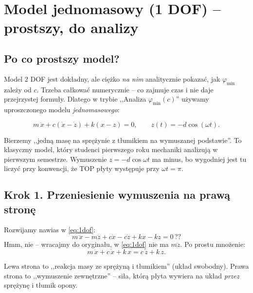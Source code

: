 \documentclass[11pt,a4paper]{article}
\theoremstyle{plainpol}
\begin{document}
\section{Model jednomasowy (1 DOF) -- prostszy, do analizy}\label{sec:1dof}

\subsection{Po co prostszy model?}

Model 2 DOF jest dokładny, ale ciężko \emph{na nim} analitycznie pokazać,
jak $\varphi_{\min}$ zależy od $c$. Trzeba całkować numerycznie -- co
zajmuje czas i nie daje przejrzystej formuły. Dlatego w trybie ,,Analiza
$\varphi_{\min}(c)$'' używamy uproszczonego modelu \emph{jednomasowego}:

\begin{equation}
  m\,\ddot{x} + c(\dot{x} - \dot{z}) + k(x - z) = 0,\qquad z(t) = -d\cos(\omega t).
  \label{eq:1dof}
\end{equation}

\begin{intuicja}
Bierzemy ,,jedną masę na sprężynie z tłumikiem na wymuszanej
podstawie''. To klasyczny model, który studenci pierwszego roku
mechaniki analizują w pierwszym semestrze. Wymuszenie $z = -d\cos\omega t$
ma minus, bo wygodniej jest tu liczyć przy konwencji, że TOP płyty
występuje przy $\omega t = \pi$.
\end{intuicja}

\subsection{Krok 1. Przeniesienie wymuszenia na prawą stronę}

Rozwijamy nawias w \cref{eq:1dof}:
\begin{equation}
  m\,\ddot{x} - m\ddot{z} + c\dot{x} - c\dot{z} + kx - kz = 0\,??
\end{equation}
Hmm, nie -- wracajmy do oryginału, w \cref{eq:1dof} nie ma $m\ddot{z}$.
Po prostu mnożenie:
\begin{equation}
  m\,\ddot{x} + c\,\dot{x} + k\,x = c\,\dot{z} + k\,z.
\end{equation}

\begin{intuicja}
Lewa strona to ,,reakcja masy ze sprężyną i tłumikiem'' (układ
swobodny). Prawa strona to ,,wymuszenie zewnętrzne'' -- siła, którą
płyta wywiera na układ \emph{przez} sprężynę i tłumik opony.
\end{intuicja}
\end{document}
